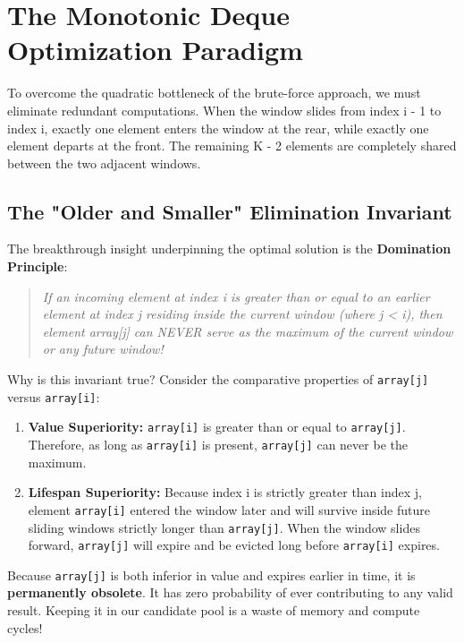 \documentclass[10pt,journal,compsoc,onecolumn]{IEEEtran}
\begin{document}
\section{The Monotonic Deque Optimization Paradigm}
\label{sec:monotonic_deque}

To overcome the quadratic bottleneck of the brute-force approach, we must eliminate redundant computations. When the window slides from index i - 1 to index i, exactly one element enters the window at the rear, while exactly one element departs at the front. The remaining K - 2 elements are completely shared between the two adjacent windows.

\subsection{The "Older and Smaller" Elimination Invariant}

The breakthrough insight underpinning the optimal solution is the \textbf{Domination Principle}:
\begin{quote}
\emph{If an incoming element at index i is greater than or equal to an earlier element at index j residing inside the current window (where j < i), then element array[j] can NEVER serve as the maximum of the current window or any future window!}
\end{quote}

Why is this invariant true? Consider the comparative properties of \texttt{array[j]} versus \texttt{array[i]}:
\begin{enumerate}
    \item \textbf{Value Superiority:} \texttt{array[i]} is greater than or equal to \texttt{array[j]}. Therefore, as long as \texttt{array[i]} is present, \texttt{array[j]} can never be the maximum.
    \item \textbf{Lifespan Superiority:} Because index i is strictly greater than index j, element \texttt{array[i]} entered the window later and will survive inside future sliding windows strictly longer than \texttt{array[j]}. When the window slides forward, \texttt{array[j]} will expire and be evicted long before \texttt{array[i]} expires.
\end{enumerate}

Because \texttt{array[j]} is both inferior in value and expires earlier in time, it is \textbf{permanently obsolete}. It has zero probability of ever contributing to any valid result. Keeping it in our candidate pool is a waste of memory and compute cycles!
\end{document}
